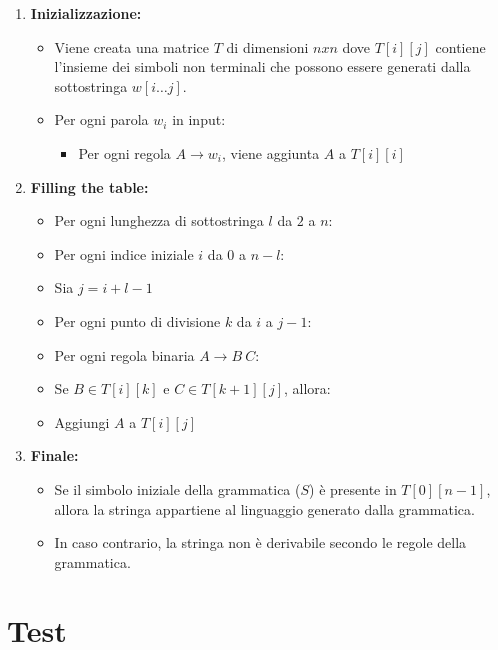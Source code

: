 \begin{enumerate}
  \item \textbf{Inizializzazione:} 
    \begin{itemize}
      \item Viene creata una matrice $T$ di dimensioni $n x n$ dove $T[i][j]$ contiene l'insieme dei simboli non terminali che possono essere generati dalla sottostringa $w[i\dots j]$. 
      \item Per ogni parola $w_i$ in input: 
      \begin{itemize}
        \item Per ogni regola $A \rightarrow w_i$, viene aggiunta $A$ a $T[i][i]$
      \end{itemize}
    \end{itemize}
  

\item \textbf{Filling the table:}
  \begin{itemize}
    \item Per ogni lunghezza di sottostringa $l$ da $2$ a $n$:
    \item[] Per ogni indice iniziale $i$ da $0$ a $n - l$:
    \item[] \quad Sia $j = i + l - 1$
    \item[] \quad Per ogni punto di divisione $k$ da $i$ a $j - 1$:
    \item[] \quad \quad Per ogni regola binaria $A \rightarrow B \ C$:
    \item[] \quad \quad \quad Se $B \in T[i][k]$ e $C \in T[k+1][j]$, allora:
    \item[] \quad \quad \quad \quad Aggiungi $A$ a $T[i][j]$
  \end{itemize}

  \item \textbf{Finale:}
    \begin{itemize}
      \item Se il simbolo iniziale della grammatica ($S$) è presente in $T[0][n-1]$, allora la stringa appartiene al linguaggio generato dalla grammatica.
      \item In caso contrario, la stringa non è derivabile secondo le regole della grammatica.
    \end{itemize}
\end{enumerate}

\section{Test}

